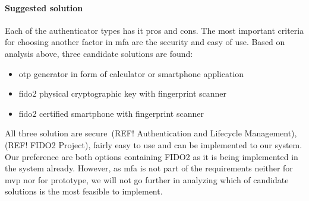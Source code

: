 \paragraph{Suggested solution}
Each of the authenticator types has it pros and cons. The most important criteria for choosing another factor in \acrshort{mfa} are the security and easy of use. Based on analysis above, three candidate solutions are found:
\begin{itemize}[noitemsep]
    \item \acrshort{otp} generator in form of calculator or smartphone application
    \item \acrshort{fido}2 physical cryptographic key with fingerprint scanner
    \item \acrshort{fido}2 certified smartphone with fingerprint scanner
\end{itemize}
All three solution are secure~\cite{}(REF!  Authentication and Lifecycle Management),\cite{} (REF! FIDO2 Project), fairly easy to use and can be implemented to our system. Our preference are both options containing FIDO2 as it is being implemented in the system already. However, as \acrshort{mfa} is not part of the requirements neither for \acrshort{mvp} nor for prototype, we will not go further in analyzing which of candidate solutions is the most feasible to implement.
